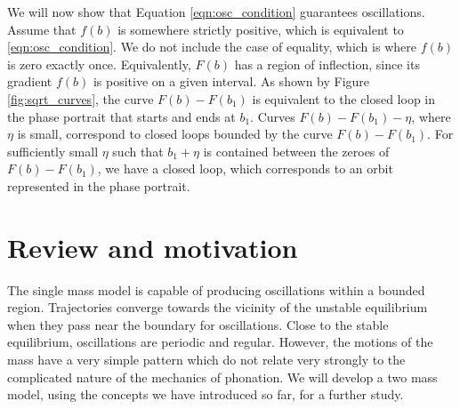 We will now show that Equation \ref{eqn:osc_condition} guarantees oscillations.
Assume that $f(b)$ is somewhere strictly positive, which is equivalent to \ref{eqn:osc_condition}.
We do not include the case of equality,
which is where $f(b)$ is zero exactly once.
Equivalently, $F(b)$ has a region of inflection,
since its gradient $f(b)$ is positive on a given interval.
As shown by Figure \ref{fig:sqrt_curves},
the curve $F(b)-F(b_1)$ is equivalent to the closed loop in the phase portrait that starts and ends at $b_1$.
Curves $F(b)-F(b_1)-\eta$, where $\eta$ is small,
correspond to closed loops bounded by the curve $F(b)-F(b_1)$.
For sufficiently small $\eta$ such that $b_1+\eta$ is contained between the zeroes of $F(b)-F(b_1)$,
we have a closed loop, which corresponds to an orbit represented in the phase portrait.

\section{Review and motivation}

The single mass model is capable of producing oscillations within a bounded region.
Trajectories converge towards the vicinity of the unstable equilibrium when they pass near the boundary for oscillations.
Close to the stable equilibrium, oscillations are periodic and regular.
However, the motions of the mass have a very simple pattern which do not relate very strongly to the complicated nature of the mechanics of phonation.
We will develop a two mass model, using the concepts we have introduced so far, for a further study.








%
%

%